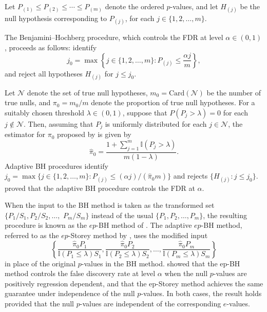 \documentclass[11pt]{article}
\numberwithin{equation}{section}
\theoremstyle{plain}
\theoremstyle{remark}
\begin{document}
Let \( P_{(1)} \leq P_{(2)} \leq \cdots \leq P_{(m)} \) denote the ordered \( p \)-values, and let \( H_{(j)} \) be the null hypothesis corresponding to \( P_{(j)} \), for each \( j \in \{1, 2, \ldots, m\} \). 

The Benjamini–Hochberg procedure, which controls the FDR at level \( \alpha \in (0,1) \), proceeds as follows: identify
\[
j_0 = \max \left\{ j \in \{1,2,\ldots,m\} : P_{(j)} \leq \frac{\alpha j}{m} \right\},
\]
and reject all hypotheses \( H_{(j)} \) for \( j \leq j_0 \).

Let \(\mathcal{N}\) denote the set of true null hypotheses, \(m_0 = \text{Card}(\mathcal{N})\) be the number of true nulls, and \(\pi_0 = m_0/m\) denote the proportion of true null hypotheses. For a suitably chosen threshold \(\lambda \in (0,1)\), suppose that \(P(P_j > \lambda) = 0\) for each \(j \notin \mathcal{N}\). Then, assuming that \(P_j\) is uniformly distributed for each $j\in\mathcal{N}$, the estimator for \(\pi_0\) proposed by \citet{storey2004strong} is given by
\begin{equation*}
    \hat{\pi}_0 = \frac{1 + \sum_{j=1}^m \mathbb{I}(P_j > \lambda)}{m(1 - \lambda)}.
\end{equation*}
Adaptive BH procedures identify $j_0=\max\{j\in \{1,2,\ldots,m\}:P_{(j)}\leq (\alpha j)/(\hat{\pi}_0 m)\}$ and rejects $\{H_{(j)}:j\leq j_0\}$. \citet{benjamini2006adaptive} proved that the adaptive BH procedure controls the FDR at $\alpha$. 

When the input to the BH method is taken as the transformed set \(\{P_1/S_1, P_2/S_2, \ldots,\) \(P_m/S_m\}\) instead of the usual \(\{P_1, P_2, \ldots, P_m\}\), the resulting procedure is known as the \(ep\)-BH method of \citet{ignatiadis2024evalues}. The adaptive $ep$-BH method, referred to as the \(ep\)-Storey method by \citet{ignatiadis2024evalues}, uses the modified input
\[
\left\{ \frac{\hat{\pi}_0 P_1}{\mathbb{I}(P_1 \leq \lambda) S_1}, \frac{\hat{\pi}_0 P_2}{\mathbb{I}(P_2 \leq \lambda) S_2}, \ldots, \frac{\hat{\pi}_0 P_m}{\mathbb{I}(P_m \leq \lambda) S_m} \right\}
\]
in place of the original \(p\)-values in the BH method. \citet{ignatiadis2024evalues} showed that the ep-BH method controls the false discovery rate at level \(\alpha\) when the null \(p\)-values are positively regression dependent, and that the ep-Storey method achieves the same guarantee under independence of the null \(p\)-values. In both cases, the result holds provided that the null \(p\)-values are independent of the corresponding \(e\)-values.
\end{document}
